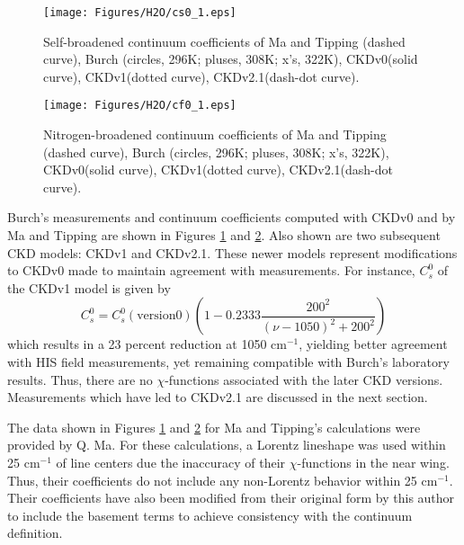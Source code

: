 \documentclass[11pt]{article}
\begin{document}
\begin{figure}[h]
\begin{center}\texttt{[image: Figures/H2O/cs0\_1.eps]}
\end{center}
   \caption[Self-broadened continuum coefficients of Ma and Tipping, Burch
	and Clough.]{Self-broadened continuum coefficients of Ma and
Tipping (dashed curve), Burch (circles, 296K; pluses, 308K; x's, 322K),
	CKDv0(solid curve), CKDv1(dotted curve), CKDv2.1(dash-dot curve).}
   \label{fig:cs0_1}
\end{figure}

\begin{figure}[h]
\begin{center}\texttt{[image: Figures/H2O/cf0\_1.eps]}\end{center}
   \caption[Nitrogen-broadened continuum coefficients of Ma and Tipping, 
  Burch and Clough.]{Nitrogen-broadened continuum coefficients of Ma and 
Tipping (dashed curve), Burch (circles, 296K; pluses, 308K; x's, 322K),
	CKDv0(solid curve), CKDv1(dotted curve), CKDv2.1(dash-dot curve).}
   \label{fig:cf0_1}
\end{figure}

Burch's measurements and continuum coefficients computed with CKDv0 and by
Ma and Tipping are shown in Figures \ref{fig:cs0_1} and
\ref{fig:cf0_1}.  Also shown are two subsequent CKD models:
CKDv1 and CKDv2.1.  These newer models represent modifications to CKDv0 made
to maintain agreement with measurements.  For instance, $C_s^0$ 
of the CKDv1 model is given by
\begin{equation}
C_s^0=C_s^0(\mbox{version} 0) \left( 1 - 0.2333\frac{200^2}{(\nu-1050)^2 + 200^2}\right)
\end{equation}
which results in a 23 percent reduction at 1050 cm$^{-1}$, yielding better
agreement with HIS field measurements, yet remaining compatible with
Burch's laboratory results.  Thus, there are no $\chi$-functions
associated with the later CKD versions.  Measurements which have led to CKDv2.1
are discussed in the next section.  

The data shown in Figures \ref{fig:cs0_1} and \ref{fig:cf0_1} for Ma and
Tipping's calculations were provided by Q. Ma.  For these calculations, a
Lorentz lineshape was used within 25 cm$^{-1}$ of line centers due the
inaccuracy of their $\chi$-functions in the near wing.  Thus, their
coefficients do not include any non-Lorentz behavior within 25 cm$^{-1}$.
Their coefficients have also been modified from their original form
by this author to include the basement terms to achieve consistency 
with the continuum definition.
\end{document}
